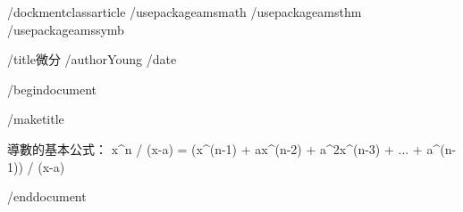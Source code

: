 /dockmentclass{article}
/usepackage{amsmath}
/usepackage{amsthm}
/usepackage{amssymb}

/title{微分}
/author{Young}
/date{}

/begin{document}

/maketitle

導數的基本公式：
x^n / (x-a) = (x^(n-1) + ax^(n-2) + a^2x^(n-3) + ... + a^(n-1)) / (x-a)

/end{document}
